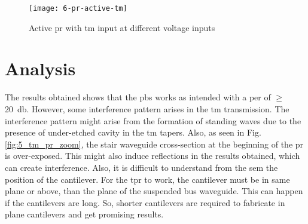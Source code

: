 \documentclass[../report.tex]{subfiles}
\begin{document}
	\begin{figure}[H] %
		\centering
		\texttt{[image: 6-pr-active-tm]}
		\caption{Active \gls{pr} with \gls{tm} input at different voltage inputs}
		\label{fig:6_pr_active_tm}
	\end{figure}
	
	\section{Analysis}
	The results obtained shows that the \gls{pbs} works as intended with a \gls{per} of $\geq$ \SI{20}{\decibel}. However, some interference pattern arises in the \gls{tm} transmission. The interference pattern might arise from the formation of standing waves due to the presence of under-etched cavity in the \gls{tm} tapers. Also, as seen in Fig. \ref{fig:5_tm_pr_zoom}, the stair waveguide cross-section at the beginning of the \gls{pr} is over-exposed. This might also induce reflections in the results obtained, which can create interference. Also, it is difficult to understand from the \gls{sem} the position of the cantilever. For the \gls{tpr} to work, the cantilever must be in same plane or above, than the plane of the suspended bus waveguide. This can happen if the cantilevers are long. So, shorter cantilevers are required to fabricate in plane cantilevers and get promising results.
\end{document}
